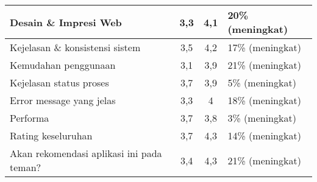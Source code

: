 \begin{longtable}{|X|c|c|X|}
Desain \& Impresi Web	&	3,3	&	4,1	&	{\color[HTML]{009901}20\%	(meningkat)}\\ \hline
Kejelasan \& konsistensi sistem	&	3,5	&	4,2	&	{\color[HTML]{009901}17\% (meningkat)}	\\ \hline
Kemudahan penggunaan	&	3,1	&	3,9	&	{\color[HTML]{009901}21\% (meningkat)}	\\ \hline
Kejelasan status proses	&	3,7	&	3,9	&	{\color[HTML]{009901}5\% (meningkat)}	\\ \hline
Error message yang jelas	&	3,3	&	4	&	{\color[HTML]{009901}18\% (meningkat)}	\\ \hline
Performa	&	3,7	&	3,8	&	{\color[HTML]{009901} 3\% (meningkat)}	\\ \hline
Rating keseluruhan	&	3,7	&	4,3	&	{\color[HTML]{009901}14\% (meningkat)}	\\ \hline
Akan rekomendasi aplikasi ini pada teman?	&	3,4	&	4,3	&	{\color[HTML]{009901}21\% (meningkat)}	\\ \hline

\end{longtable}